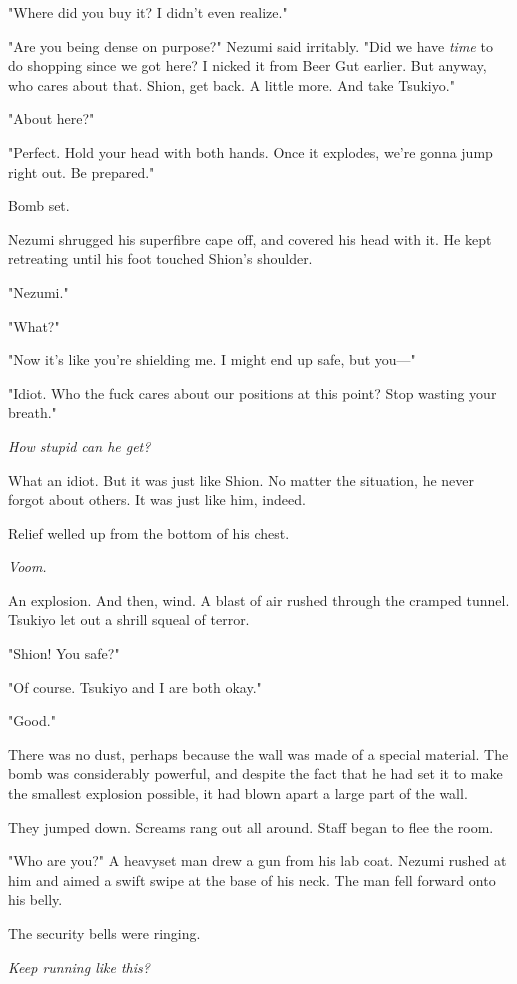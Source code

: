 "Where did you buy it? I didn't even realize."

"Are you being dense on purpose?" Nezumi said irritably. "Did we have
\emph{time} to do shopping since we got here? I nicked it from Beer Gut
earlier. But anyway, who cares about that. Shion, get back. A little
more. And take Tsukiyo."

"About here?"

"Perfect. Hold your head with both hands. Once it explodes, we're gonna
jump right out. Be prepared."

Bomb set.

Nezumi shrugged his superfibre cape off, and covered his head with it.
He kept retreating until his foot touched Shion's shoulder.

"Nezumi."

"What?"

"Now it's like you're shielding me. I might end up safe, but you---"

"Idiot. Who the fuck cares about our positions at this point? Stop
wasting your breath."

\emph{How stupid can he get?}

What an idiot. But it was just like Shion. No matter the situation, he
never forgot about others. It was just like him, indeed.

Relief welled up from the bottom of his chest.

\emph{Voom.}

An explosion. And then, wind. A blast of air rushed through the cramped
tunnel. Tsukiyo let out a shrill squeal of terror.

"Shion! You safe?"

"Of course. Tsukiyo and I are both okay."

"Good."

There was no dust, perhaps because the wall was made of a special
material. The bomb was considerably powerful, and despite the fact that
he had set it to make the smallest explosion possible, it had blown
apart a large part of the wall.

They jumped down. Screams rang out all around. Staff began to flee the
room.

"Who are you?" A heavyset man drew a gun from his lab coat. Nezumi
rushed at him and aimed a swift swipe at the base of his neck. The man
fell forward onto his belly.

The security bells were ringing.

\emph{Keep running like this?}

